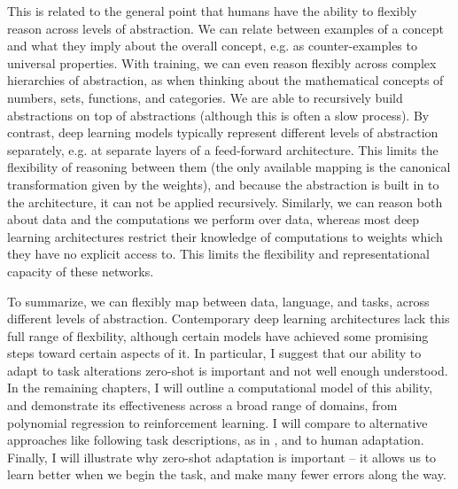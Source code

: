 This is related to the general point that humans have the ability to flexibly reason across levels of abstraction. We can relate between examples of a concept and what they imply about the overall concept, e.g. as counter-examples to universal properties. With training, we can even reason flexibly across complex hierarchies of abstraction, as when thinking about the mathematical concepts of numbers, sets, functions, and categories. We are able to recursively build abstractions on top of abstractions (although this is often a slow process). By contrast, deep learning models typically represent different levels of abstraction separately, e.g. at separate layers of a feed-forward architecture. This limits the flexibility of reasoning between them (the only available mapping is the canonical transformation given by the weights), and because the abstraction is built in to the architecture, it can not be applied recursively. Similarly, we can reason both about data and the computations we perform over data, whereas most deep learning architectures restrict their knowledge of computations to weights which they have no explicit access to. This limits the flexibility and representational capacity of these networks. \par 
To summarize, we can flexibly map between data, language, and tasks, across different levels of abstraction. Contemporary deep learning architectures lack this full range of flexbility, although certain models have achieved some promising steps toward certain aspects of it. In particular, I suggest that our ability to adapt to task alterations zero-shot is important and not well enough understood. In the remaining chapters, I will outline a computational model of this ability, and demonstrate its effectiveness across a broad range of domains, from polynomial regression to reinforcement learning. I will compare to alternative approaches like following task descriptions, as in \citet{Hill2019a}, and to human adaptation. Finally, I will illustrate why zero-shot adaptation is important -- it allows us to learn better when we begin the task, and make many fewer errors along the way. \par 


